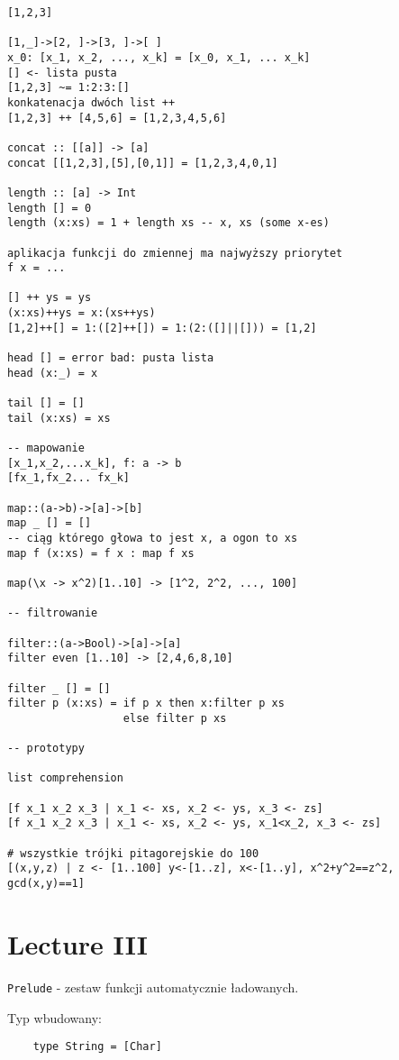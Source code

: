 \documentclass{article}
\begin{document}
\begin{verbatim}
[1,2,3]

[1,_]->[2, ]->[3, ]->[ ]
x_0: [x_1, x_2, ..., x_k] = [x_0, x_1, ... x_k]
[] <- lista pusta
[1,2,3] ~= 1:2:3:[]
konkatenacja dwóch list ++
[1,2,3] ++ [4,5,6] = [1,2,3,4,5,6]

concat :: [[a]] -> [a]
concat [[1,2,3],[5],[0,1]] = [1,2,3,4,0,1]

length :: [a] -> Int
length [] = 0
length (x:xs) = 1 + length xs -- x, xs (some x-es)

aplikacja funkcji do zmiennej ma najwyższy priorytet
f x = ...

[] ++ ys = ys
(x:xs)++ys = x:(xs++ys)
[1,2]++[] = 1:([2]++[]) = 1:(2:([]||[])) = [1,2]

head [] = error bad: pusta lista
head (x:_) = x

tail [] = []
tail (x:xs) = xs

-- mapowanie
[x_1,x_2,...x_k], f: a -> b
[fx_1,fx_2... fx_k]

map::(a->b)->[a]->[b]
map _ [] = []
-- ciąg którego głowa to jest x, a ogon to xs
map f (x:xs) = f x : map f xs

map(\x -> x^2)[1..10] -> [1^2, 2^2, ..., 100]

-- filtrowanie

filter::(a->Bool)->[a]->[a]
filter even [1..10] -> [2,4,6,8,10]

filter _ [] = []
filter p (x:xs) = if p x then x:filter p xs
                  else filter p xs

-- prototypy

list comprehension

[f x_1 x_2 x_3 | x_1 <- xs, x_2 <- ys, x_3 <- zs]
[f x_1 x_2 x_3 | x_1 <- xs, x_2 <- ys, x_1<x_2, x_3 <- zs]

# wszystkie trójki pitagorejskie do 100
[(x,y,z) | z <- [1..100] y<-[1..z], x<-[1..y], x^2+y^2==z^2, gcd(x,y)==1]

\end{verbatim}

\section{Lecture III}

\texttt{Prelude} - zestaw funkcji automatycznie ładowanych.

Typ wbudowany:
\begin{verbatim}
    type String = [Char]
\end{verbatim}
\end{document}
